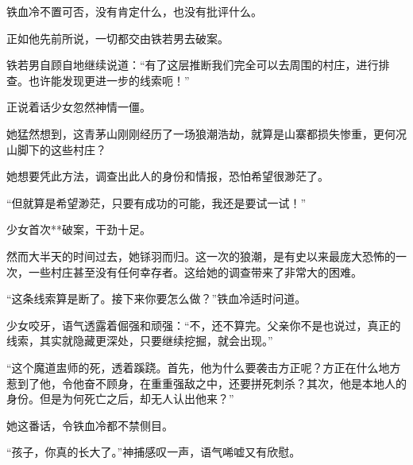 \begin{this_body}
铁血冷不置可否，没有肯定什么，也没有批评什么。

正如他先前所说，一切都交由铁若男去破案。

铁若男自顾自地继续说道：“有了这层推断我们完全可以去周围的村庄，进行排查。也许能发现更进一步的线索呃！”

正说着话少女忽然神情一僵。

她猛然想到，这青茅山刚刚经历了一场狼潮浩劫，就算是山寨都损失惨重，更何况山脚下的这些村庄？

她想要凭此方法，调查出此人的身份和情报，恐怕希望很渺茫了。

“但就算是希望渺茫，只要有成功的可能，我还是要试一试！”

少女首次**破案，干劲十足。

然而大半天的时间过去，她铩羽而归。这一次的狼潮，是有史以来最庞大恐怖的一次，一些村庄甚至没有任何幸存者。这给她的调查带来了非常大的困难。

“这条线索算是断了。接下来你要怎么做？”铁血冷适时问道。

少女咬牙，语气透露着倔强和顽强：“不，还不算完。父亲你不是也说过，真正的线索，其实就隐藏更深处，只要继续挖掘，就会出现。”

“这个魔道盅师的死，透着蹊跷。首先，他为什么要袭击方正呢？方正在什么地方惹到了他，令他奋不顾身，在重重强敌之中，还要拼死刺杀？其次，他是本地人的身份。但是为何死亡之后，却无人认出他来？”

她这番话，令铁血冷都不禁侧目。

“孩子，你真的长大了。”神捕感叹一声，语气唏嘘又有欣慰。

\end{this_body}

